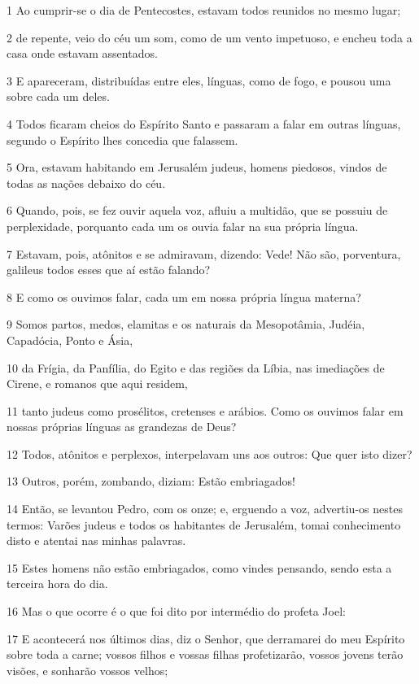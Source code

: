 \par 1 Ao cumprir-se o dia de Pentecostes, estavam todos reunidos no mesmo lugar;
\par 2 de repente, veio do céu um som, como de um vento impetuoso, e encheu toda a casa onde estavam assentados.
\par 3 E apareceram, distribuídas entre eles, línguas, como de fogo, e pousou uma sobre cada um deles.
\par 4 Todos ficaram cheios do Espírito Santo e passaram a falar em outras línguas, segundo o Espírito lhes concedia que falassem.
\par 5 Ora, estavam habitando em Jerusalém judeus, homens piedosos, vindos de todas as nações debaixo do céu.
\par 6 Quando, pois, se fez ouvir aquela voz, afluiu a multidão, que se possuiu de perplexidade, porquanto cada um os ouvia falar na sua própria língua.
\par 7 Estavam, pois, atônitos e se admiravam, dizendo: Vede! Não são, porventura, galileus todos esses que aí estão falando?
\par 8 E como os ouvimos falar, cada um em nossa própria língua materna?
\par 9 Somos partos, medos, elamitas e os naturais da Mesopotâmia, Judéia, Capadócia, Ponto e Ásia,
\par 10 da Frígia, da Panfília, do Egito e das regiões da Líbia, nas imediações de Cirene, e romanos que aqui residem,
\par 11 tanto judeus como prosélitos, cretenses e arábios. Como os ouvimos falar em nossas próprias línguas as grandezas de Deus?
\par 12 Todos, atônitos e perplexos, interpelavam uns aos outros: Que quer isto dizer?
\par 13 Outros, porém, zombando, diziam: Estão embriagados!
\par 14 Então, se levantou Pedro, com os onze; e, erguendo a voz, advertiu-os nestes termos: Varões judeus e todos os habitantes de Jerusalém, tomai conhecimento disto e atentai nas minhas palavras.
\par 15 Estes homens não estão embriagados, como vindes pensando, sendo esta a terceira hora do dia.
\par 16 Mas o que ocorre é o que foi dito por intermédio do profeta Joel:
\par 17 E acontecerá nos últimos dias, diz o Senhor, que derramarei do meu Espírito sobre toda a carne; vossos filhos e vossas filhas profetizarão, vossos jovens terão visões, e sonharão vossos velhos;
